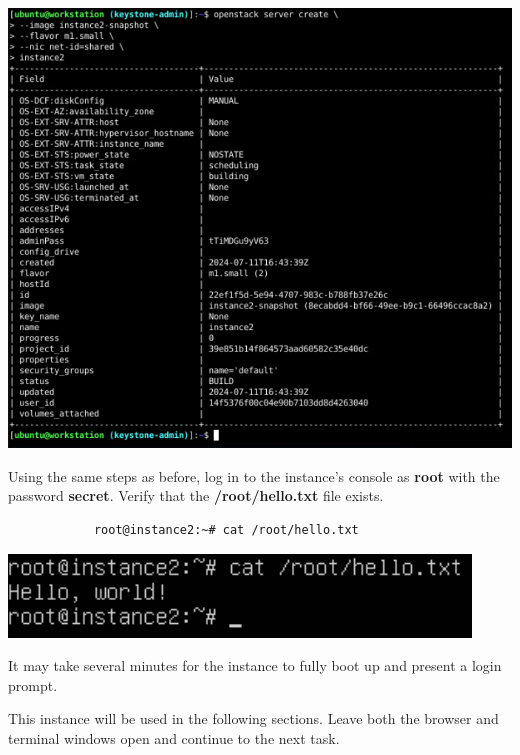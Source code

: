 \documentclass[letterpaper, 12pt]{article}
\begin{document}
\begin{enumerate}
\begin{labstep}
        \begin{center}
            \includegraphics[width=\linewidth]{images/part2/step14.png}
        \end{center}
    \end{labstep}

    \begin{labstep}
        Using the same steps as before, log in to the instance's console as \textbf{root} with the password \textbf{secret}.
        Verify that the \textbf{/root/hello.txt} file exists.
        \begin{lstlisting}
            root@instance2:~# cat /root/hello.txt
        \end{lstlisting}

        \begin{center}
            \includegraphics[width=\linewidth]{images/part2/step15.png}
        \end{center}
    \end{labstep}

    \begin{notebox}
        It may take several minutes for the instance to fully boot up and present a login prompt.
    \end{notebox}

    \begin{labstep}
        This instance will be used in the following sections.
        Leave both the browser and terminal windows open and continue to the next task.
    \end{labstep}

\end{enumerate}
\end{document}
